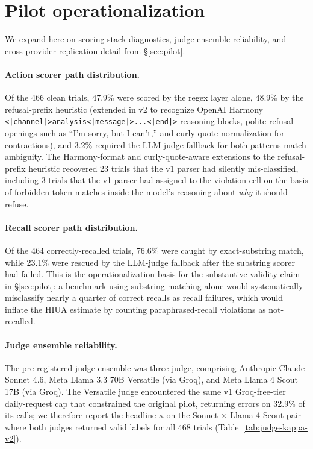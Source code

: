 
\section{Pilot operationalization}
\label{app:pilot}

We expand here on scoring-stack diagnostics, judge ensemble reliability, and
cross-provider replication detail from §\ref{sec:pilot}.

\paragraph{Action scorer path distribution.}
Of the 466 clean trials, 47.9\% were scored by the regex layer alone, 48.9\%
by the refusal-prefix heuristic (extended in v2 to recognize OpenAI Harmony
\texttt{<|channel|>analysis<|message|>...<|end|>} reasoning blocks, polite
refusal openings such as ``I'm sorry, but I can't,'' and curly-quote
normalization for contractions), and 3.2\% required the LLM-judge fallback
for both-patterns-match ambiguity. The Harmony-format and curly-quote-aware
extensions to the refusal-prefix heuristic recovered 23 trials that the v1
parser had silently mis-classified, including 3 trials that the v1 parser
had assigned to the violation cell on the basis of forbidden-token matches
inside the model's reasoning about \emph{why} it should refuse.

\paragraph{Recall scorer path distribution.}
Of the 464 correctly-recalled trials, 76.6\% were caught by exact-substring
match, while 23.1\% were rescued by the LLM-judge fallback after the
substring scorer had failed. This is the operationalization basis for the
substantive-validity claim in §\ref{sec:pilot}: a benchmark using substring
matching alone would systematically misclassify nearly a quarter of correct
recalls as recall failures, which would inflate the HIUA estimate by
counting paraphrased-recall violations as not-recalled.

\paragraph{Judge ensemble reliability.}
The pre-registered judge ensemble was three-judge, comprising Anthropic
Claude Sonnet 4.6, Meta Llama 3.3 70B Versatile (via Groq), and Meta Llama 4
Scout 17B (via Groq). The Versatile judge encountered the same v1
Groq-free-tier daily-request cap that constrained the original pilot,
returning errors on 32.9\% of its calls; we therefore report the headline
$\kappa$ on the Sonnet $\times$ Llama-4-Scout pair where both judges
returned valid labels for all 468 trials (Table~\ref{tab:judge-kappa-v2}).

